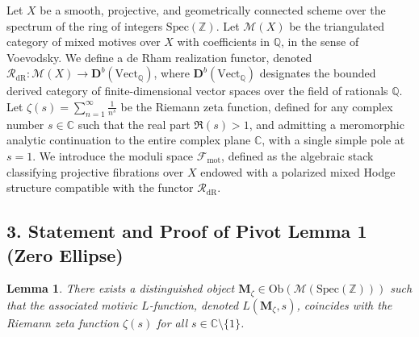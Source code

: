 \documentclass[
]{article}
\newtheorem{lemma}{Lemma}
\begin{document}
Let \(X\) be a smooth, projective, and geometrically connected scheme
over the spectrum of the ring of integers \(\mathrm{Spec}(\mathbb{Z})\).
Let \(\mathcal{M}(X)\) be the triangulated category of mixed motives
over \(X\) with coefficients in \(\mathbb{Q}\), in the sense of
Voevodsky. We define a de Rham realization functor, denoted
\(\mathcal{R}_{\mathrm{dR}} : \mathcal{M}(X) \rightarrow \mathbf{D}^b(\mathrm{Vect}_{\mathbb{Q}})\),
where \(\mathbf{D}^b(\mathrm{Vect}_{\mathbb{Q}})\) designates the
bounded derived category of finite-dimensional vector spaces over the
field of rationals \(\mathbb{Q}\). Let
\(\zeta(s) = \sum_{n=1}^{\infty} \frac{1}{n^s}\) be the Riemann zeta
function, defined for any complex number \(s \in \mathbb{C}\) such that
the real part \(\Re(s) > 1\), and admitting a meromorphic analytic
continuation to the entire complex plane \(\mathbb{C}\), with a single
simple pole at \(s=1\). We introduce the moduli space
\(\mathcal{F}_{\mathrm{mot}}\), defined as the algebraic stack
classifying projective fibrations over \(X\) endowed with a polarized
mixed Hodge structure compatible with the functor
\(\mathcal{R}_{\mathrm{dR}}\).

\hypertarget{statement-and-proof-of-pivot-lemma-1-zero-ellipse}{%
\subsection{3. Statement and Proof of Pivot Lemma 1 (Zero
Ellipse)}\label{statement-and-proof-of-pivot-lemma-1-zero-ellipse}}

\begin{lemma}
There exists a distinguished object
\(\mathbf{M}_{\zeta} \in \mathrm{Ob}(\mathcal{M}(\mathrm{Spec}(\mathbb{Z})))\)
such that the associated motivic \(L\)-function, denoted
\(L(\mathbf{M}_{\zeta}, s)\), coincides with the Riemann zeta function
\(\zeta(s)\) for all \(s \in \mathbb{C} \setminus \{1\}\).
\end{lemma}
\end{document}
